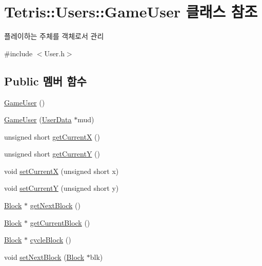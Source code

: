 \hypertarget{class_tetris_1_1_users_1_1_game_user}{}\section{Tetris\+:\+:Users\+:\+:Game\+User 클래스 참조}
\label{class_tetris_1_1_users_1_1_game_user}


플레이하는 주체를 객체로서 관리  




{\ttfamily \#include $<$User.\+h$>$}

\subsection*{Public 멤버 함수}
\begin{DoxyCompactItemize}
\item 
\hyperlink{class_tetris_1_1_users_1_1_game_user_af9d7bed8e019ca4348995337ea7339b7}{Game\+User} ()
\item 
\hyperlink{class_tetris_1_1_users_1_1_game_user_a61819671f799d3d6cb2d89e99ffd1714}{Game\+User} (\hyperlink{class_tetris_1_1_users_1_1_user_data}{User\+Data} $\ast$mud)
\item 
unsigned short \hyperlink{class_tetris_1_1_users_1_1_game_user_ad25eace96bd27ae6df4a0c0d506be730}{get\+CurrentX} ()
\item 
unsigned short \hyperlink{class_tetris_1_1_users_1_1_game_user_af5bd7ff0b575af1b42b093488cff97e2}{get\+CurrentY} ()
\item 
void \hyperlink{class_tetris_1_1_users_1_1_game_user_a2957358b1a6298f06c6c2e10cb89f623}{set\+CurrentX} (unsigned short x)
\item 
void \hyperlink{class_tetris_1_1_users_1_1_game_user_aeedbe521004c22018b73a509e99f7d81}{set\+CurrentY} (unsigned short y)
\item 
\hyperlink{class_tetris_1_1_block}{Block} $\ast$ \hyperlink{class_tetris_1_1_users_1_1_game_user_a9300608a38f8a3b10f9d6b6bdaeaab18}{get\+Next\+Block} ()
\item 
\hyperlink{class_tetris_1_1_block}{Block} $\ast$ \hyperlink{class_tetris_1_1_users_1_1_game_user_a3d4bcc74d518c28356012f8a42b85896}{get\+Current\+Block} ()
\item 
\hyperlink{class_tetris_1_1_block}{Block} $\ast$ \hyperlink{class_tetris_1_1_users_1_1_game_user_a5efbd1ed9fa84a4041c218fb32463c36}{cycle\+Block} ()
\item 
void \hyperlink{class_tetris_1_1_users_1_1_game_user_a6249d0f4e9d77edd94935a74bbd298d5}{set\+Next\+Block} (\hyperlink{class_tetris_1_1_block}{Block} $\ast$blk)

\end{DoxyCompactItemize}
